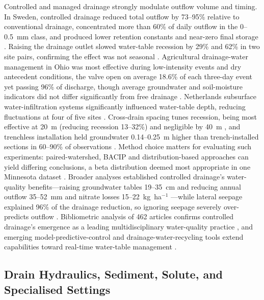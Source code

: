 Controlled and managed drainage strongly modulate outflow volume and timing. In Sweden, controlled drainage reduced total outflow by 73--95\% relative to conventional drainage, concentrated more than 60\% of daily outflow in the 0--0.5~mm class, and produced lower retention constants and near-zero final storage \parencite{Wesström2003}. Raising the drainage outlet slowed water-table recession by 29\% and 62\% in two site pairs, confirming the effect was not seasonal \parencite{Saadat2017}. Agricultural drainage-water management in Ohio was most effective during low-intensity events and dry antecedent conditions, the valve open on average 18.6\% of each three-day event yet passing 96\% of discharge, though average groundwater and soil-moisture indicators did not differ significantly from free drainage \parencite{Miller2022}. Netherlands subsurface water-infiltration systems significantly influenced water-table depth, reducing fluctuations at four of five sites \parencite{vandeCraats2025}. Cross-drain spacing tunes recession, being most effective at 20~m (reducing recession 13--32\%) and negligible by 40~m \parencite{Vaiciukynas2015}, and trenchless installation held groundwater 0.14--0.25~m higher than trench-installed sections in 60--90\% of observations \parencite{Salo2019}. Method choice matters for evaluating such experiments: paired-watershed, BACIP and distribution-based approaches can yield differing conclusions, a beta distribution deemed most appropriate in one Minnesota dataset \parencite{Pagliari2021}. Broader analyses established controlled drainage's water-quality benefits---raising groundwater tables 19--35~cm and reducing annual outflow 35--52~mm and nitrate losses 15--22~kg~ha$^{-1}$ \parencite{Kesicka2023}---while lateral seepage explained 96\% of the drainage reduction, so ignoring seepage severely over-predicts outflow \parencite{Youssef2021,Saadat2018,Österholm2015}. Bibliometric analysis of 462 articles confirms controlled drainage's emergence as a leading multidisciplinary water-quality practice \parencite{Kesicka2023b}, and emerging model-predictive-control and drainage-water-recycling tools extend capabilities toward real-time water-table management \parencite{Ikonen2023,Reinhart2020,VandeCraats2021}.

\subsection{Drain Hydraulics, Sediment, Solute, and Specialised Settings}

